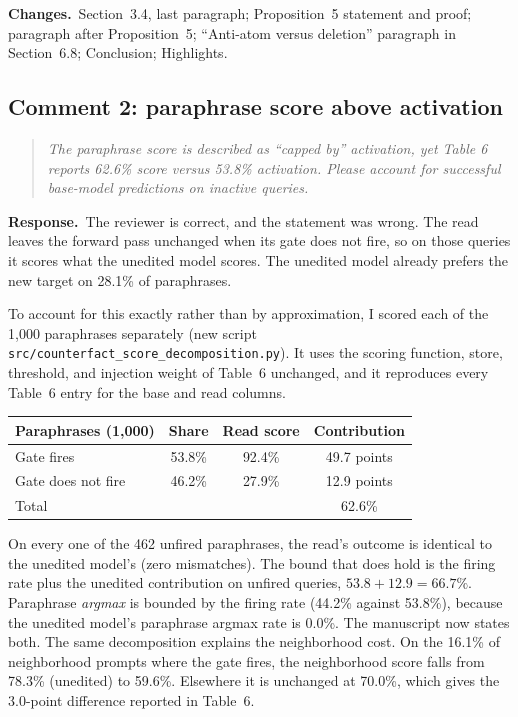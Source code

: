 \documentclass[11pt]{article}
\newenvironment{reviewer}{\par\medskip\noindent\begin{quote}\itshape}{\end{quote}}
\newcommand{\response}{\par\noindent\textbf{Response.}\ }
\newcommand{\changes}{\par\smallskip\noindent\textbf{Changes.}\ }
\begin{document}
\changes Section~3.4, last paragraph; Proposition~5 statement and proof; paragraph after Proposition~5; ``Anti-atom versus deletion'' paragraph in Section~6.8; Conclusion; Highlights.

\subsection*{Comment 2: paraphrase score above activation}

\begin{reviewer}
The paraphrase score is described as ``capped by'' activation, yet Table 6 reports 62.6\% score versus 53.8\% activation. Please account for successful base-model predictions on inactive queries.
\end{reviewer}

\response The reviewer is correct, and the statement was wrong. The read leaves the forward pass unchanged when its gate does not fire, so on those queries it scores what the unedited model scores. The unedited model already prefers the new target on 28.1\% of paraphrases.

To account for this exactly rather than by approximation, I scored each of the 1,000 paraphrases separately (new script \nolinkurl{src/counterfact_score_decomposition.py}). It uses the scoring function, store, threshold, and injection weight of Table~6 unchanged, and it reproduces every Table~6 entry for the base and read columns.
\begin{center}
\begin{tabular}{@{}lccc@{}}
\toprule
Paraphrases (1,000) & Share & Read score & Contribution \\
\midrule
Gate fires & 53.8\% & 92.4\% & 49.7 points \\
Gate does not fire & 46.2\% & 27.9\% & 12.9 points \\
\midrule
Total & & & 62.6\% \\
\bottomrule
\end{tabular}
\end{center}
On every one of the 462 unfired paraphrases, the read's outcome is identical to the unedited model's (zero mismatches). The bound that does hold is the firing rate plus the unedited contribution on unfired queries, $53.8+12.9=66.7\%$. Paraphrase \emph{argmax} is bounded by the firing rate (44.2\% against 53.8\%), because the unedited model's paraphrase argmax rate is 0.0\%. The manuscript now states both. The same decomposition explains the neighborhood cost. On the 16.1\% of neighborhood prompts where the gate fires, the neighborhood score falls from 78.3\% (unedited) to 59.6\%. Elsewhere it is unchanged at 70.0\%, which gives the 3.0-point difference reported in Table~6.
\end{document}
